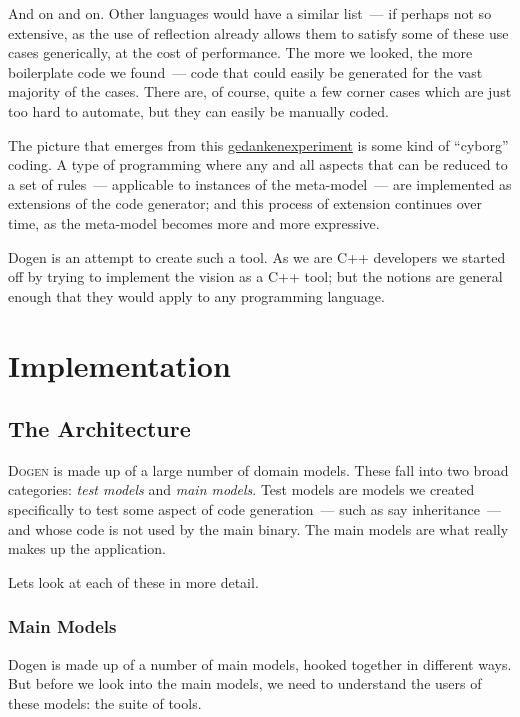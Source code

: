 \documentclass{book}
\begin{document}
And on and on. Other languages would have a similar list~--- if
perhaps not so extensive, as the use of reflection already allows them
to satisfy some of these use cases generically, at the cost of
performance. The more we looked, the more boilerplate code we
found~--- code that could easily be generated for the vast majority of
the cases. There are, of course, quite a few corner cases which are
just too hard to automate, but they can easily be manually coded.

The picture that emerges from this
\href{http://en.wikipedia.org/wiki/Thought_experiment}{gedankenexperiment}
is some kind of ``cyborg'' coding. A type of programming where any and
all aspects that can be reduced to a set of rules~--- applicable to
instances of the meta-model~--- are implemented as extensions of the
code generator; and this process of extension continues over time, as
the meta-model becomes more and more expressive.

Dogen is an attempt to create such a tool. As we are C++ developers we
started off by trying to implement the vision as a C++ tool; but the
notions are general enough that they would apply to any programming
language.

\part{Implementation}

\chapter{The Architecture}

\lettrine{D}{ogen} is made up of a large number of domain
models. These fall into two broad categories: \emph{test models} and
\emph{main models}. Test models are models we created specifically to
test some aspect of code generation~--- such as say inheritance~---
and whose code is not used by the main binary. The main models are
what really makes up the application.

Lets look at each of these in more detail.

\section{Main Models}

Dogen is made up of a number of main models, hooked together in
different ways. But before we look into the main models, we need to
understand the users of these models: the suite of tools.
\end{document}
